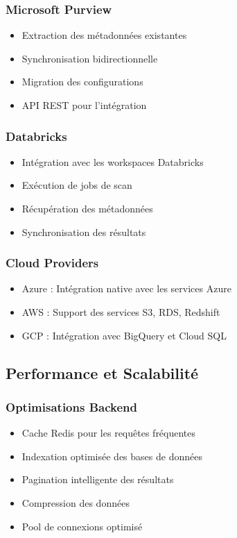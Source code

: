 \documentclass[12pt,a4paper]{article}
\begin{document}
\subsubsection{Microsoft Purview}
\begin{itemize}
    \item Extraction des métadonnées existantes
    \item Synchronisation bidirectionnelle
    \item Migration des configurations
    \item API REST pour l'intégration
\end{itemize}

\subsubsection{Databricks}
\begin{itemize}
    \item Intégration avec les workspaces Databricks
    \item Exécution de jobs de scan
    \item Récupération des métadonnées
    \item Synchronisation des résultats
\end{itemize}

\subsubsection{Cloud Providers}
\begin{itemize}
    \item Azure : Intégration native avec les services Azure
    \item AWS : Support des services S3, RDS, Redshift
    \item GCP : Intégration avec BigQuery et Cloud SQL
\end{itemize}

\subsection{Performance et Scalabilité}

\subsubsection{Optimisations Backend}
\begin{itemize}
    \item Cache Redis pour les requêtes fréquentes
    \item Indexation optimisée des bases de données
    \item Pagination intelligente des résultats
    \item Compression des données
    \item Pool de connexions optimisé
\end{itemize}
\end{document}
